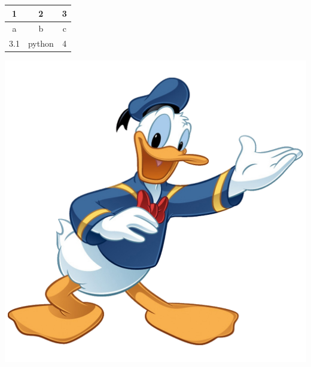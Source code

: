 \documentclass{article}
\begin{document}
\begin{center}
\begin{tabular}{ | c | c | c | }
\hline
1 & 2 & 3 \\ \hline
a & b & c \\ \hline
3.1 & python & 4 \\ \hline
\end{tabular}
\end{center}
\includegraphics[scale=0.2]{artifacts/2.2/donald-duck-smiling.png}
\end{document}
